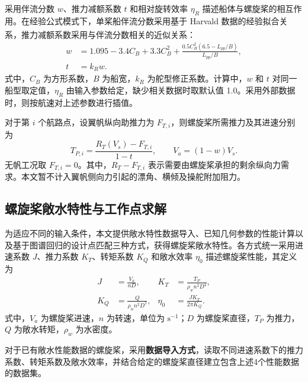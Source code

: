 \documentclass[UTF8,a4paper,twoside,zihao=5,fontset=windows]{ctexart}
\begin{document}
采用伴流分数 $w$、推力减额系数 $t$ 和相对旋转效率 $\eta_R$ 描述船体与螺旋桨的相互作用。在经验公式模式下，单桨船伴流分数采用基于 Harvald 数据的经验拟合关系\textsuperscript{\cite{harvald1983,molland2011}}，推力减额系数采用与伴流分数相关的近似关系\textsuperscript{\cite{molland2011}}：
\begin{equation}
\begin{aligned}
w&=1.095-3.4C_B+3.3C_B^2
+\frac{0.5C_B^2(6.5-L_{pp}/B)}{L_{pp}/B},\\
t&=k_Rw.
\end{aligned}
\label{eq:wake}
\end{equation}
式中，$C_B$ 为方形系数，$B$ 为船宽，$k_R$ 为舵型修正系数。计算中，$w$ 和 $t$ 对同一船型取定值，$\eta_R$ 由输入参数给定，缺少相关数据时取默认值 1.0。采用外部数据时，则按航速对上述参数进行插值。

对于第 $i$ 个航路点，设翼帆纵向助推力为 $F_{T,i}$，则螺旋桨所需推力及其进速分别为
\begin{equation}
T_{P,i}=\frac{R_T(V_s)-F_{T,i}}{1-t},\qquad V_a=(1-w)V_s.
\label{eq:required_thrust}
\end{equation}
无帆工况取 $F_{T,i}=0$。其中，$R_T-F_{T,i}$ 表示需要由螺旋桨承担的剩余纵向力需求。本文暂不计入翼帆侧向力引起的漂角、横倾及操舵附加阻力。

\subsection{螺旋桨敞水特性与工作点求解}
\label{sec:propeller-open-water}

为适应不同的输入条件，本文提供敞水特性数据导入、已知几何参数的性能计算以及基于图谱回归的设计点匹配三种方式，获得螺旋桨敞水特性。各方式统一采用进速系数 $J$、推力系数 $K_T$、转矩系数 $K_Q$ 和敞水效率 $\eta_0$ 描述螺旋桨性能，其定义为
\begin{equation}
\begin{aligned}
J&=\frac{V_a}{nD},& K_T&=\frac{T_P}{\rho_w n^2D^4},\\
K_Q&=\frac{Q}{\rho_w n^2D^5},& \eta_0&=\frac{JK_T}{2\pi K_Q}.
\end{aligned}
\label{eq:open_water}
\end{equation}
式中，$V_a$ 为螺旋桨进速，$n$ 为转速，单位为 $\mathrm{s}^{-1}$；$D$ 为螺旋桨直径，$T_P$ 为推力，$Q$ 为敞水转矩，$\rho_w$ 为水密度。

对于已有敞水性能数据的螺旋桨，采用\textbf{数据导入方式}，读取不同进速系数下的推力系数、转矩系数及敞水效率，并结合给定的螺旋桨直径建立包含上述4个性能数据的数据集。
\end{document}
